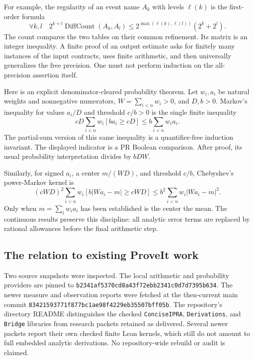 For example, the regularity of an event name $A_k$ with levels $\ell(k)$ is
the first-order formula
\[
 \forall k,l\quad
 2^{k+l}\operatorname{DiffCount}(A_k,A_l)
 \le 2^{\max(\ell(k),\ell(l))}(2^k+2^l).
\]
The count compares the two tables on their common refinement. Its matrix
is an integer inequality. A finite proof of an output estimate asks for
finitely many instances of the input contracts, uses finite arithmetic, and
then universally generalizes the free precision. One must not perform
induction on the all-precision assertion itself.

Here is an explicit denominator-cleared probability theorem. Let $w_i,a_i$
be natural weights and nonnegative numerators, $W=\sum_{i<n}w_i>0$, and
$D,b>0$. Markov's inequality for values $a_i/D$ and threshold $c/b>0$ is
the single finite inequality
\begin{equation}\label{eq:markov-object}
 cD\sum_{i<n}w_i[ba_i\ge cD]
 \le b\sum_{i<n}w_i a_i.
\end{equation}
The partial-sum version of this same inequality is a quantifier-free
induction invariant. The displayed indicator is a PR Boolean comparison.
After proof, its usual probability interpretation divides by $bDW$.

Similarly, for signed $a_i$, a center $m/(WD)$, and threshold $c/b$,
Chebyshev's power-Markov kernel is
\[
 (cWD)^2\sum_{i<n}w_i[b|Wa_i-m|\ge cWD]
 \le b^2\sum_{i<n}w_i|Wa_i-m|^2.
\]
Only when $m=\sum_iw_ia_i$ has been established is the center the mean.
The continuous results preserve this discipline: all analytic error terms
are replaced by rational allowances before the final arithmetic step.

\subsection{The relation to existing ProveIt work}

Two source snapshots were inspected. The local arithmetic and probability
providers are pinned to
\texttt{b2341af5370cd8a43f72ebb2341c0d7d7395b634}. The newer measure and
observation reports were fetched at the then-current main commit
\texttt{83421593771f877bc1ae98f4229eb35507bff05b}.
The repository's directory README distinguishes the checked
\texttt{ConciseIPRA}, \texttt{Derivations}, and \texttt{Bridge} libraries
from research packets retained as delivered. Several newer packets report
their own checked finite Lean kernels, which still do not amount to full
embedded analytic derivations. No repository-wide rebuild or audit is claimed.

